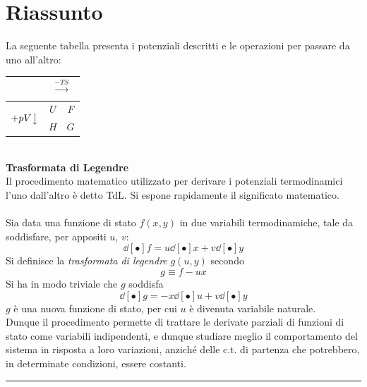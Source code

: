 \documentclass[10pt, oneside]{book}
\newcommand{\infobox}[2]{\vspace{0.5cm}~\\ \textbf{#1} \hrulefill \vspace{0.2cm}\\#2 {}\,\\\hrule \vspace{0.5cm}}
\newcommand{\ds}{\displaystyle}
\begin{document}
\section{Riassunto}
La seguente tabella presenta i potenziali descritti e le operazioni per passare da uno all'altro:
\begin{center}
\begin{tabular}{c|c|c|}
& \multicolumn{2}{c}{$\xrightarrow[]{-\ds TS}$} \\ \hline
\multirow{4}{*}{$+ pV \big\downarrow$} & \multirow{2}{*}{$U$} & \multirow{2}{*}{$F$} \\ 
& & \\\cline{2-3}
& \multirow{2}{*}{$H$} & \multirow{2}{*}{$G$} \\
& & \\\hline
\end{tabular}
\end{center}

\infobox{Trasformata di Legendre}{
Il procedimento matematico utilizzato per derivare i potenziali termodinamici l'uno dall'altro è detto TdL. Si espone rapidamente il significato matematico.
\\~\\
Sia data una funzione di stato $f(x,y)$ in due variabili termodinamiche, tale da soddisfare, per appositi $u$, $v$:
\[\dd[•]{f} = u \dd[•]{x} + v \dd[•]{y}\]
Si definisce la \textit{trasformata di legendre} $g(u, y)$ secondo
\[g \equiv f - ux\]
Si ha in modo triviale che $g$ soddisfa
\[\dd[•]{g} = - x \dd[•]{u} + v \dd[•]{y}\]
$g$ è una nuova funzione di stato, per cui $u$ è divenuta variabile naturale.\\
Dunque il procedimento permette di trattare le derivate parziali di funzioni di stato come variabili indipendenti, e dunque studiare meglio il comportamento del sistema in risposta a loro variazioni, anziché delle c.t. di partenza che potrebbero, in determinate condizioni, essere costanti.
}
\end{document}

